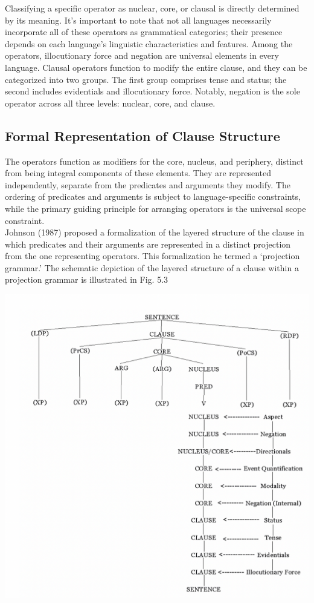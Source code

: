 Classifying a specific operator as nuclear, core, or clausal is directly determined by its meaning. It's important to note that not all languages necessarily incorporate all of these operators as grammatical categories; their presence depends on each language's linguistic characteristics and features. 
Among the operators, illocutionary force and negation are universal elements in every language. Clausal operators function to modify the entire clause, and they can be categorized into two groups. The first group comprises tense and status; the second includes evidentials and illocutionary force. Notably, negation is the sole operator across all three levels: nuclear, core, and clause.


\subsection{Formal Representation of Clause Structure}

The operators function as modifiers for the core, nucleus, and periphery, distinct from being integral components of these elements. They are represented independently, separate from the predicates and arguments they modify. The ordering of predicates and arguments is subject to language-specific constraints, while the primary guiding principle for arranging operators is the universal scope constraint. \\

Johnson (1987) proposed a formalization of the layered
structure of the clause in which predicates and their arguments are represented in a distinct projection from the one representing operators. This formalization
he termed a ‘projection grammar.’ The schematic depiction of the layered structure of a clause within a projection grammar is illustrated in Fig. 5.3

\includegraphics[width=\textwidth]{figures/general-structure-clause.png}

